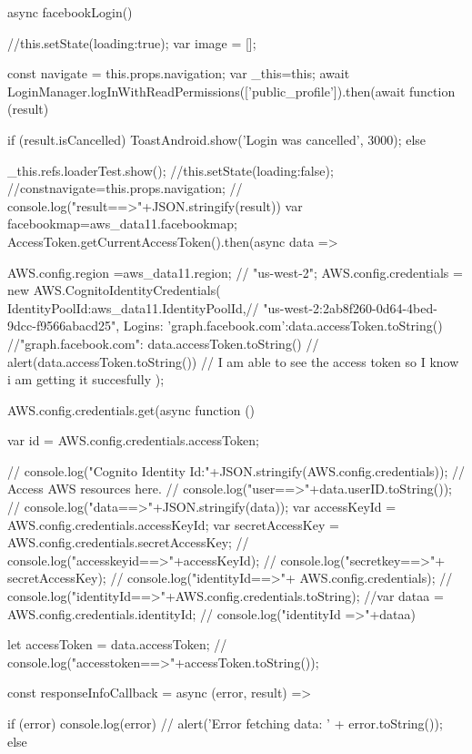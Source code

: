 {  async facebookLogin() { //this.setState({loading:true});
    var image = [];
    

    const { navigate } = this.props.navigation;
    var _this=this;
    await LoginManager.logInWithReadPermissions(['public_profile']).then(await
      function (result) {
        if (result.isCancelled) {
          ToastAndroid.show('Login was cancelled', 3000);
        } else {
          _this.refs.loaderTest.show();
          //this.setState({loading:false});
          //const{navigate}=this.props.navigation;
          // console.log("result==>"+JSON.stringify(result))
          var facebookmap=aws_data11.facebookmap;
          AccessToken.getCurrentAccessToken().then(async data => {
            AWS.config.region =aws_data11.region; // "us-west-2";
            AWS.config.credentials = new AWS.CognitoIdentityCredentials(
              {
                IdentityPoolId:aws_data11.IdentityPoolId,//  "us-west-2:2ab8f260-0d64-4bed-9dcc-f9566abacd25",
                Logins: {
                  'graph.facebook.com':data.accessToken.toString()
                  //"graph.facebook.com": data.accessToken.toString()
                }
                //  alert(data.accessToken.toString()) // I am able to see the access token so I know i am getting it succesfully
              });


            AWS.config.credentials.get(async function () {
              var id = AWS.config.credentials.accessToken;
              
             //  console.log("Cognito Identity Id:"+JSON.stringify(AWS.config.credentials));
              // Access AWS resources here.
              // console.log("user==>"+data.userID.toString());
              // console.log("data==>"+JSON.stringify(data));
              var accessKeyId = AWS.config.credentials.accessKeyId;
              var secretAccessKey = AWS.config.credentials.secretAccessKey;
              //  console.log("accesskeyid==>"+accessKeyId);
              //  console.log("secretkey==>"+ secretAccessKey);
              //  console.log("identityId==>"+ AWS.config.credentials);
              //  console.log("identityId==>"+AWS.config.credentials.toString);
              //var dataa = AWS.config.credentials.identityId;
              // console.log("identityId =>"+dataa)

              let accessToken = data.accessToken;
              // console.log("accesstoken==>"+accessToken.toString());

              const responseInfoCallback = async (error, result) => {
                if (error) {
                  console.log(error)
                  //   alert('Error fetching data: ' + error.toString());
                } else {                
                 
}}}}}}}}
